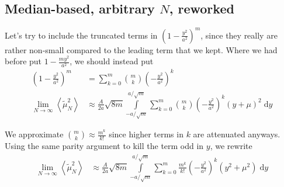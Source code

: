 \documentclass[12pt]{report}
\newcommand{\expvalue}[1]{\left<#1\right>}
\begin{document}
\subsection{Median-based, arbitrary $N$, reworked}

Let's try to include the truncated terms in $\left( 1 - \frac{y^2}{a^2}
\right)^m$, since they really are rather non-small compared to the leading term
that we kept. Where we had before put $1 - \frac{my^2}{a^2}$, we should instead
put
\begin{align}
    \left( 1 - \frac{y^2}{a^2} \right)^m
        &= \sum\limits_{k=0}^{m} \binom{m}{k}\left( -\frac{y^2}{a^2} \right)^k\\
    \lim_{N \to \infty}\expvalue{\tilde{\mu}_N^2}
        &\approx \frac{A}{2a}\sqrt{8m}
            \int\limits_{-a/\sqrt{m}}^{a/\sqrt{m}}
                \sum\limits_{k=0}^{m}\binom{m}{k}
                    \left( -\frac{y^2}{a^2} \right)^k
                (y+\mu)^2
            \;\mathrm{d}y
\end{align}

We approximate $\binom{m}{k} \approx \frac{m^k}{k!}$ since higher terms in $k$
are attenuated anyways. Using the same parity argument to kill the term odd in
$y$, we rewrite
\begin{align}
    \lim_{N \to \infty}\expvalue{\tilde{\mu}_N^2}
        &\approx \frac{A}{2a}\sqrt{8m}
            \int\limits_{-a/\sqrt{m}}^{a/\sqrt{m}}
                \sum\limits_{k=0}^{m}\frac{m^k}{k!}
                    \left( -\frac{y^2}{a^2} \right)^k
                (y^2+\mu^2)
            \;\mathrm{d}y
\end{align}
\end{document}
